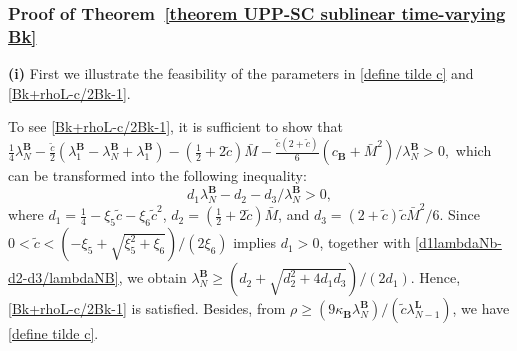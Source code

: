 \documentclass[10pt,a4paper]{amsart}
\begin{document}
\subsubsection{Proof of Theorem~\ref{theorem UPP-SC sublinear time-varying Bk}}\label{proof theorem UPP-SC sublinear time-varying Bk}

\textbf{(i)} First we illustrate the feasibility of the parameters in \eqref{define tilde c} and \eqref{Bk+rhoL-c/2Bk-1}. 



To see \eqref{Bk+rhoL-c/2Bk-1}, it is sufficient to show that $\frac{1}{4}\lambda_N^{\mathbf{B}}-\frac{\tilde{c}}{2}(\lambda_1^{\mathbf{B}}-\lambda_N^{\mathbf{B}}+\lambda_1^{\mathbf{B}})-(\frac{1}{2}+2\tilde{c})\bar{M}
-\frac{\tilde{c}(2+\tilde{c})}{6}(c_\mathbf{B}+\bar{M}^2)/\lambda_N^{\mathbf{B}}> 0,$
which can be transformed into the following inequality:
\begin{equation}\label{d1lambdaNb-d2-d3/lambdaNB}
	d_1\lambda_N^{\mathbf{B}}-d_2-d_3/\lambda_N^{\mathbf{B}} >0,
\end{equation}
where $d_1= \frac{1}{4}- \xi_5 \tilde{c}-\xi_6 \tilde{c}^2$, $d_2 = (\frac{1}{2}+2\tilde{c})\bar{M}$, and $d_3={(2+\tilde{c})\tilde{c}}\bar{M}^2/6$.
Since $0<\tilde{c}<({-\xi_5+\sqrt{\xi_5^2+\xi_6}})/({2\xi_6})$ implies $d_1>0$, together with \eqref{d1lambdaNb-d2-d3/lambdaNB}, we obtain $\lambda_N^{\mathbf{B}}\geq ({d_2+\sqrt{d_2^2+4d_1d_3}})/({2d_1})$. Hence, \eqref{Bk+rhoL-c/2Bk-1} is satisfied. Besides, from $\rho \geq ({9\kappa_{\mathbf{B}}\lambda_N^{\mathbf{B}}})/({\tilde{c}\lambda_{N-1}^{\mathbf{L}}})$, we have \eqref{define tilde c}.
\end{document}
